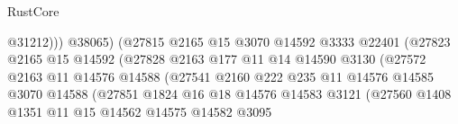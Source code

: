\begin{lexlean}{RustCore}
\begin{coremodule}
                                              @31212)))
                                        @38065)
                                      (@27815
                                        @2165
                                        @15
                                        @3070
                                        @14592
                                        @3333
                                        @22401
                                        (@27823
                                          @2165
                                          @15
                                          @14592
                                          (@27828
                                            @2163
                                            @177
                                            @11
                                            @14
                                            @14590
                                            @3130
                                            (@27572
                                              @2163
                                              @11
                                              @14576
                                              @14588
                                              (@27541
                                                @2160
                                                @222
                                                @235
                                                @11
                                                @14576
                                                @14585
                                                @3070
                                                @14588
                                                (@27851
                                                  @1824
                                                  @16
                                                  @18
                                                  @14576
                                                  @14583
                                                  @3121
                                                  (@27560
                                                    @1408
                                                    @1351
                                                    @11
                                                    @15
                                                    @14562
                                                    @14575
                                                    @14582
                                                    @3095

\end{coremodule}
\end{lexlean}
